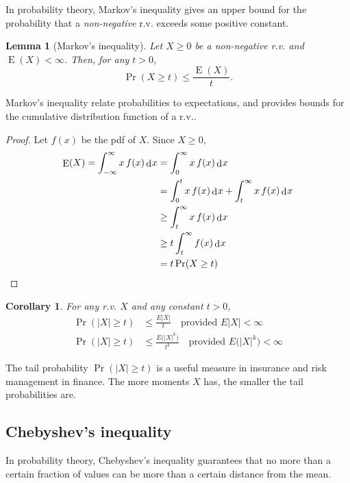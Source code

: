 \documentclass[
]{book}
\DeclareMathOperator{\E}{E}
\DeclareMathOperator{\dd}{d}
\newcommand{\dint}{\dd\hspace{0.5pt}\!}
\newtheorem{lemma}{Lemma}[chapter]
\newtheorem{corollary}{Corollary}[chapter]
\theoremstyle{definition}
\theoremstyle{definition}
\theoremstyle{definition}
\theoremstyle{definition}
\theoremstyle{remark}
\begin{document}
In probability theory, Markov's inequality gives an upper bound for the
probability that a \emph{non-negative} r.v. exceeds some positive constant.

\begin{lemma}[Markov's inequality]
Let \(X\geq 0\) be a non-negative r.v. and \(\E(X) < \infty\). Then, for any
\(t>0\), \[\Pr(X\geq t) \leq \frac{\E(X)}{t}.\]
\end{lemma}

Markov's inequality relate probabilities to expectations, and provides
bounds for the cumulative distribution function of a r.v..

\begin{proof}
Let \(f(x)\) be the pdf of \(X\). Since \(X\geq 0\), \[\begin{aligned}
    \E(X) = \int_{-\infty}^{\infty} x\,f(x) \dint x &= \int_0^{\infty} x\,f(x) \dint x \\
    &= \int_0^t x\,f(x) \dint x + \int_t^\infty x\,f(x) \dint x \\
    &\geq \int_t^\infty x\,f(x) \dint x \\
    &\geq t\int_t^\infty f(x) \dint x \\
    &= t\Pr(X\geq t) 
  \end{aligned}\]
\end{proof}

\begin{corollary}
For any r.v. \(X\) and any constant \(t>0\), \[\begin{aligned}
      \Pr(|X|\geq t) &\leq \frac{E|X|}{t} \ \ \ \text{ provided } E|X|<\infty \\
      \Pr(|X|\geq t) &\leq \frac{E\big(|X|^k\big)}{t^k} \ \ \ \text{ provided } E\big(|X|^k\big)<\infty
    \end{aligned}\]
\end{corollary}

The tail probability \(\Pr(|X|\geq t)\) is a useful measure in insurance and
risk management in finance. The more moments \(X\) has, the smaller the
tail probabilities are.

\hypertarget{chebyshevs-inequality}{%
\subsection{Chebyshev's inequality}\label{chebyshevs-inequality}}

In probability theory, Chebyshev's inequality guarantees that no more
than a certain fraction of values can be more than a certain distance
from the mean.
\end{document}
